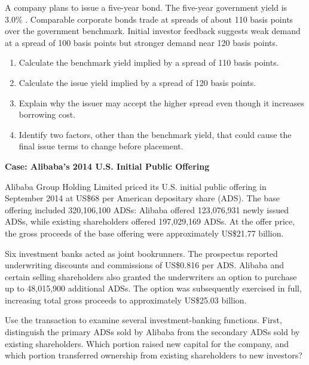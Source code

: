 \begin{enumerate}
A company plans to issue a five-year bond. The five-year government yield is 3.0\% . Comparable corporate bonds trade at spreads of about 110 basis points over the government benchmark. Initial investor feedback suggests weak demand at a spread of 100 basis points but stronger demand near 120 basis points.

\begin{enumerate}

\item Calculate the benchmark yield implied by a spread of 110 basis points.

\item Calculate the issue yield implied by a spread of 120 basis points.

\item Explain why the issuer may accept the higher spread even though it increases borrowing cost.

\item Identify two factors, other than the benchmark yield, that could cause the final issue terms to change before placement.

\end{enumerate}

\end{enumerate}



\textbf{Case: Alibaba's 2014 U.S. Initial Public Offering}

Alibaba Group Holding Limited priced its U.S. initial public offering in September 2014 at US\$68 per American depositary share (ADS). The base offering included 320,106,100 ADSs: Alibaba offered 123,076,931 newly issued ADSs, while existing shareholders offered 197,029,169 ADSs. At the offer price, the gross proceeds of the base offering were approximately US\$21.77 billion.

Six investment banks acted as joint bookrunners. The prospectus reported underwriting discounts and commissions of US\$0.816 per ADS. Alibaba and certain selling shareholders also granted the underwriters an option to purchase up to 48,015,900 additional ADSs. The option was subsequently exercised in full, increasing total gross proceeds to approximately US\$25.03 billion.

Use the transaction to examine several investment-banking functions. First, distinguish the primary ADSs sold by Alibaba from the secondary ADSs sold by existing shareholders. Which portion raised new capital for the company, and which portion transferred ownership from existing shareholders to new investors?

